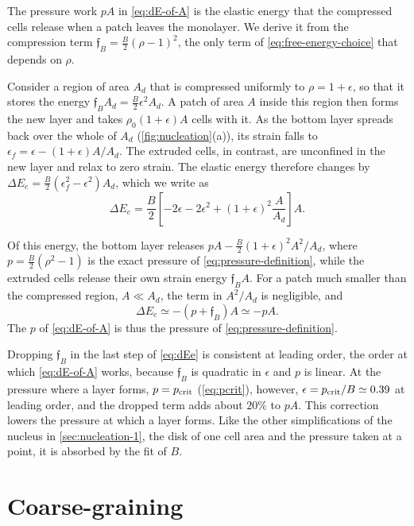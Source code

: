 \documentclass[aps,pre,reprint,superscriptaddress,longbibliography,nofootinbib
]{revtex4-2}
\begin{document}
The pressure work $pA$ in \cref{eq:dE-of-A} is the elastic
energy that the compressed cells release when a patch
leaves the monolayer. We derive it from the compression
term $\mathfrak f_B=\tfrac B2(\rho-1)^2$, the only term of
\cref{eq:free-energy-choice} that depends on $\rho$.

Consider a region of area $A_d$ that is compressed
uniformly to $\rho=1+\epsilon$, so that it stores the
energy $\mathfrak f_BA_d=\tfrac B2\epsilon^2A_d$. A patch
of area $A$ inside this region then forms the new layer and
takes $\rho_0(1+\epsilon)A$ cells with it. As the bottom
layer spreads back over the whole of $A_d$
(\cref{fig:nucleation}(a)), its strain falls to
$\epsilon_f=\epsilon-(1+\epsilon)A/A_d$. The extruded
cells, in contrast, are unconfined in the new layer and
relax to zero strain. The elastic energy therefore changes
by $\Delta E_e=\tfrac B2(\epsilon_f^2-\epsilon^2)A_d$,
which we write as
\begin{equation}
    \label{eq:dEe-full}
    \Delta E_e = \frac B2\left[-2\epsilon - 2\epsilon^2
    + (1+\epsilon)^2\frac A{A_d}\right]A.
\end{equation}

Of this energy, the bottom layer releases $pA-\tfrac
B2(1+\epsilon)^2A^2/A_d$, where $p=\tfrac B2(\rho^2-1)$ is
the exact pressure of \cref{eq:pressure-definition}, while
the extruded cells release their own strain energy
$\mathfrak f_BA$. For a patch much smaller than the
compressed region, $A\ll A_d$, the term in $A^2/A_d$ is
negligible, and
\begin{equation}
    \label{eq:dEe}
    \Delta E_e \simeq -(p+\mathfrak f_B)A \simeq -pA.
\end{equation}
The $p$ of \cref{eq:dE-of-A} is thus the pressure of
\cref{eq:pressure-definition}.

Dropping $\mathfrak f_B$ in the last step of \cref{eq:dEe}
is consistent at leading order, the order at which
\cref{eq:dE-of-A} works, because $\mathfrak f_B$ is
quadratic in $\epsilon$ and $p$ is linear. At the pressure
where a layer forms, $p=p_{\rm crit}$ (\cref{eq:pcrit}), however,
$\epsilon=p_{\rm crit}/B\simeq0.39$ at leading order, and the
dropped term adds about $20\%$ to $pA$. This correction
lowers the pressure at which a layer forms. Like the other
simplifications of the nucleus in \cref{sec:nucleation-1},
the disk of one cell area and the pressure taken at a
point, it is absorbed by the fit of $B$.


\section{Coarse-graining}
\label{app:dean}
\end{document}
